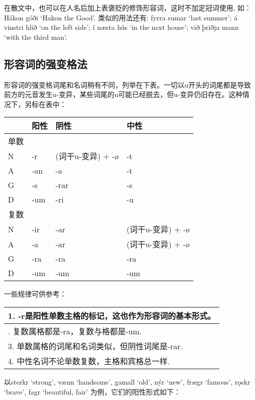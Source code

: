 在散文中，也可以在人名后加上表褒贬的修饰形容词，这时不加定冠词使用,
如：Hákon góði `Hakon the Good‌'. 类似的用法还有: fyrra sumar `last
summer‌'; á vinstri hlið `on the left side‌'; í næsta hús `in the next
house‌'; við þriðja mann `with the third man‌'.

\subsection{形容词的强变格法}\label{ux5f62ux5bb9ux8bcdux7684ux5f3aux53d8ux683cux6cd5}

形容词的强变格词尾和名词稍有不同，列举在下表。一切以u开头的词尾都是导致前方的元音发生u-变异，某些词尾的u可能已经脱去，但u-变异仍旧存在。这种情况下，另标在表中：

\begin{longtable}{llll}
\toprule
 & 阳性 & 阴性 & 中性 \\
\midrule
\endhead
\bottomrule
\endfoot
单数 & & & \\
N & -r & (词干u-变异) + -ø & -t \\
A & -an & -a & -t \\
G & -s & -rar & -s \\
D & -um & -ri & -u \\
复数 & & & \\
N & -ir & -ar & (词干u-变异) + -ø \\
A & -a & -ar & (词干u-变异) + -ø \\
G & -ra & -ra & -ra \\
D & -um & -um & -um \\
\end{longtable}

一些规律可供参考：

\begin{longtable}{l}
\toprule
1. -r是阳性单数主格的标记，这也作为形容词的基本形式。 \\
\midrule
\endhead
\bottomrule
\endfoot
2. 复数属格都是-ra，复数与格都是-um. \\
3. 单数属格的词尾和名词类似，但阴性词尾是-rar. \\
4. 中性名词不论单数复数，主格和宾格总一样. \\
\end{longtable}

以sterkr `strong‌', vænn `handsome‌', gamall `old‌', nýr `new‌', frægr
`famous‌', rǫskr `brave‌', fagr `beautiful, fair'
为例，它们的阳性形式如下：

